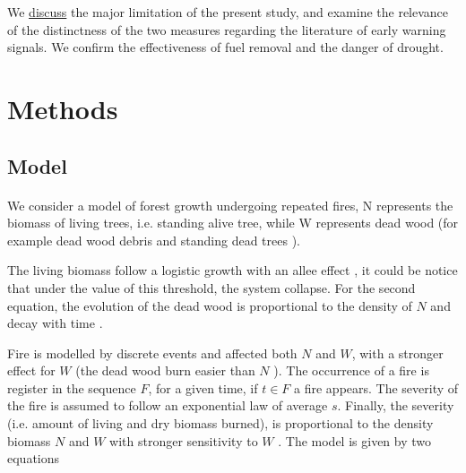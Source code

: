 \documentclass{article}
\begin{document}
We \hyperref[Discussion]{discuss} the major limitation of the present study, and examine the relevance of the distinctness of the two measures regarding the literature of early warning signals. We confirm the effectiveness of fuel removal and the danger of drought.








\newpage
\section{Methods}


\subsection{Model}

\label{dynamical_system}

\paragraph{}
We consider a model of forest growth undergoing repeated fires, N represents the biomass of living trees, i.e. standing alive tree, while W represents dead wood (for example dead wood debris and standing dead trees \citep{russell2015quantifying}). 

The living biomass follow a logistic growth \citep{tsoularis2002analysis, jensen1975comparison} with an allee effect \citep{stephens1999allee, amarasekare1998allee}, it could be notice that under the value of this threshold, the system collapse. For the second equation, the evolution of the dead wood is proportional to the density of $N$ and decay with time \citep{kahl_wood_2017, shorohova_stump_2012, christensen_estimation_1977, delaney_quantity_1998}.%

Fire is modelled by discrete events and affected both $N$ and $W$, with a stronger effect for $W$ (the dead wood burn easier than $N$ \citep{brown1985predicting}). The occurrence of a fire is register in the sequence $F$, for a given time, if $t\in F$ a fire appears. The severity of the fire is assumed to follow an exponential law of average $s$. Finally, the severity (i.e. amount of living and dry biomass burned), is proportional to the density biomass $N$ and $W$ with stronger sensitivity to $W$ \citep{martinson_fuel_2013, safford_effects_2009, lecomte_effects_2006}. The model is given by two equations
\end{document}
